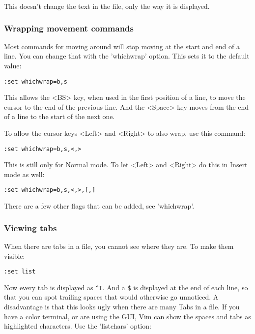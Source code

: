 This doesn't change the text in the file, only the way it is displayed.

\subsubsection{Wrapping movement commands}

Most commands for moving around will stop moving at the start and end of a line.
You can change that with the 'whichwrap' option.
This sets it to the default value:

 \begin{Verbatim}[samepage=true]
 :set whichwrap=b,s
 \end{Verbatim}

This allows the <BS> key, when used in the first position of a line, to move the cursor to the end of the previous line.
And the <Space> key moves from the end of a line to the start of the next one.

To allow the cursor keys <Left> and <Right> to also wrap, use this command:

 \begin{Verbatim}[samepage=true]
 :set whichwrap=b,s,<,>
 \end{Verbatim}

This is still only for Normal mode.
To let <Left> and <Right> do this in Insert mode as well:

 \begin{Verbatim}[samepage=true]
 :set whichwrap=b,s,<,>,[,]
 \end{Verbatim}

There are a few other flags that can be added, see 'whichwrap'.

\subsubsection{Viewing tabs}
When there are tabs in a file, you cannot see where they are.
To make them visible:

 \begin{Verbatim}[samepage=true]
 :set list
 \end{Verbatim}

Now every tab is displayed as \verb!^I!.
And a \verb!$! is displayed at the end of each line, so that you can spot trailing spaces that would otherwise go unnoticed.
A disadvantage is that this looks ugly when there are many Tabs in a file.
If you have a color terminal, or are using the GUI, Vim can show the spaces and tabs as highlighted characters.
Use the 'listchars' option:

